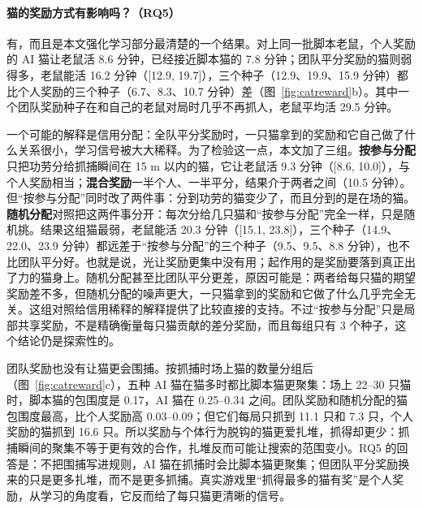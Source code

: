 \paragraph{猫的奖励方式有影响吗？（RQ5）}有，而且是本文强化学习部分最清楚的一个结果。对上同一批脚本老鼠，个人奖励的 AI 猫让老鼠活 8.6 分钟，已经接近脚本猫的 7.8 分钟；团队平分奖励的猫则弱得多，老鼠能活 16.2 分钟（[12.9, 19.7]），三个种子（12.9、19.9、15.9 分钟）都比个人奖励的三个种子（6.7、8.3、10.7 分钟）差（图~\ref{fig:catreward}b）。其中一个团队奖励种子在和自己的老鼠对局时几乎不再抓人，老鼠平均活 29.5 分钟。

一个可能的解释是信用分配：全队平分奖励时，一只猫拿到的奖励和它自己做了什么关系很小，学习信号被大大稀释\cite{sunehag2018}。为了检验这一点，本文加了三组。\textbf{按参与分配}只把功劳分给抓捕瞬间在 15 m 以内的猫，它让老鼠活 9.3 分钟（[8.6, 10.0]），与个人奖励相当；\textbf{混合奖励}一半个人、一半平分，结果介于两者之间（10.5 分钟）。但“按参与分配”同时改了两件事：分到功劳的猫变少了，而且分到的是在场的猫。\textbf{随机分配}对照把这两件事分开：每次分给几只猫和“按参与分配”完全一样，只是随机挑。结果这组猫最弱，老鼠能活 20.3 分钟（[15.1, 23.8]），三个种子（14.9、22.0、23.9 分钟）都远差于“按参与分配”的三个种子（9.5、9.5、8.8 分钟），也不比团队平分好。也就是说，光让奖励更集中没有用；起作用的是奖励要落到真正出了力的猫身上。随机分配甚至比团队平分更差，原因可能是：两者给每只猫的期望奖励差不多，但随机分配的噪声更大，一只猫拿到的奖励和它做了什么几乎完全无关。这组对照给信用稀释的解释提供了比较直接的支持。不过“按参与分配”只是局部共享奖励，不是精确衡量每只猫贡献的差分奖励，而且每组只有 3 个种子，这个结论仍是探索性的。

团队奖励也没有让猫更会围捕。按抓捕时场上猫的数量分组后（图~\ref{fig:catreward}c），五种 AI 猫在猫多时都比脚本猫更聚集：场上 22–30 只猫时，脚本猫的包围度是 0.17，AI 猫在 0.25–0.34 之间。团队奖励和随机分配的猫包围度最高，比个人奖励高 0.03–0.09；但它们每局只抓到 11.1 只和 7.3 只，个人奖励的猫抓到 16.6 只。所以奖励与个体行为脱钩的猫更爱扎堆，抓得却更少：抓捕瞬间的聚集不等于更有效的合作，扎堆反而可能让搜索的范围变小。RQ5 的回答是：不把围捕写进规则，AI 猫在抓捕时会比脚本猫更聚集；但团队平分奖励换来的只是更多扎堆，而不是更多抓捕。真实游戏里“抓得最多的猫有奖”是个人奖励，从学习的角度看，它反而给了每只猫更清晰的信号。
